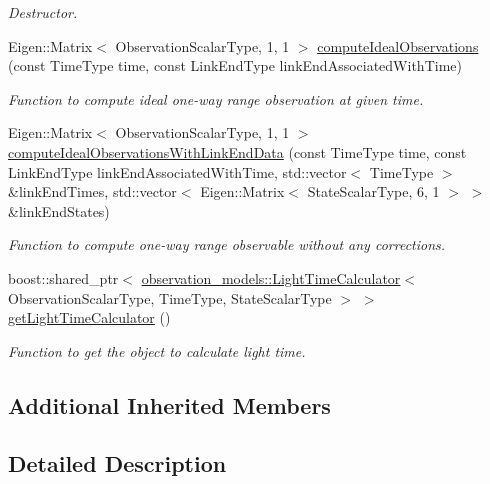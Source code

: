 \begin{DoxyCompactItemize}
\begin{DoxyCompactList}\small\item\em Destructor. \end{DoxyCompactList}\item 
Eigen\+::\+Matrix$<$ Observation\+Scalar\+Type, 1, 1 $>$ \hyperlink{classtudat_1_1observation__models_1_1OneWayRangeObservationModel_a5769a9cb140e316bbd5f7d18009bfbbe}{compute\+Ideal\+Observations} (const Time\+Type time, const Link\+End\+Type link\+End\+Associated\+With\+Time)
\begin{DoxyCompactList}\small\item\em Function to compute ideal one-\/way range observation at given time. \end{DoxyCompactList}\item 
Eigen\+::\+Matrix$<$ Observation\+Scalar\+Type, 1, 1 $>$ \hyperlink{classtudat_1_1observation__models_1_1OneWayRangeObservationModel_a114b3c63a963459b4f0cdfb314d10401}{compute\+Ideal\+Observations\+With\+Link\+End\+Data} (const Time\+Type time, const Link\+End\+Type link\+End\+Associated\+With\+Time, std\+::vector$<$ Time\+Type $>$ \&link\+End\+Times, std\+::vector$<$ Eigen\+::\+Matrix$<$ State\+Scalar\+Type, 6, 1 $>$ $>$ \&link\+End\+States)
\begin{DoxyCompactList}\small\item\em Function to compute one-\/way range observable without any corrections. \end{DoxyCompactList}\item 
boost\+::shared\+\_\+ptr$<$ \hyperlink{classtudat_1_1observation__models_1_1LightTimeCalculator}{observation\+\_\+models\+::\+Light\+Time\+Calculator}$<$ Observation\+Scalar\+Type, Time\+Type, State\+Scalar\+Type $>$ $>$ \hyperlink{classtudat_1_1observation__models_1_1OneWayRangeObservationModel_a5ce2b4ba94b5a2a230953142a194314e}{get\+Light\+Time\+Calculator} ()
\begin{DoxyCompactList}\small\item\em Function to get the object to calculate light time. \end{DoxyCompactList}\end{DoxyCompactItemize}
\subsection*{Additional Inherited Members}


\subsection{Detailed Description}
